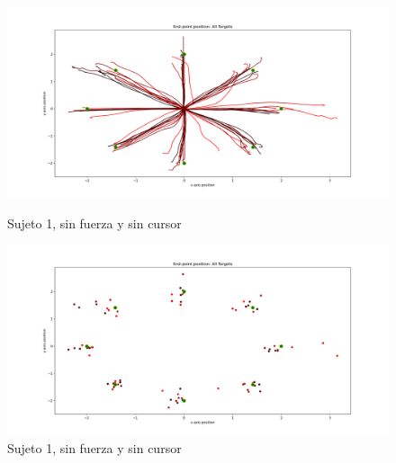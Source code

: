 \documentclass[a4paper,11pt, oneside]{book}
\begin{document}
\begin{figure}[H]
	\begin{minipage}[b]{0.5\linewidth}
		\centering
		\includegraphics[width=\linewidth]{sujeto1/no_force_no_cursor/trayectorias}
		\caption{Sujeto 1, sin fuerza y sin cursor}
		\label{fig:figura1}
	\end{minipage}
	\hspace{0.5cm}
	\begin{minipage}[b]{0.5\linewidth}
		\centering
		\includegraphics[width=\linewidth]{sujeto1/no_force_no_cursor/trayectorias_puntos}
		\caption{Sujeto 1, sin fuerza y sin cursor}
		\label{fig:figura2}
	\end{minipage}
\end{figure}
\end{document}

